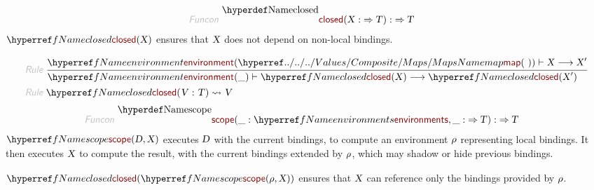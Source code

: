 \begin{align*}
  \KEY{Funcon} ~ 
  & \NAMEDECL{closed}(\VAR{X} :  \TO \VAR{T}) :  \TO \VAR{T}
\end{align*}
$\SHADE{\NAMEREF{closed}
           ( \VAR{X} )}$ ensures that $\SHADE{\VAR{X}}$ does not depend on non-local bindings.

\begin{align*}
  \KEY{Rule} ~ 
    & \RULE{
      \NAMEREF{environment} ( \NAMEHYPER{../../../Values/Composite}{Maps}{map}
                               (  ~  ) ) \vdash \VAR{X} \TRANS 
        \VAR{X}'
      }{
      & \NAMEREF{environment} ( \_ ) \vdash \NAMEREF{closed}
                      ( \VAR{X} ) \TRANS 
          \NAMEREF{closed}
            ( \VAR{X}' )
      }
\\
  \KEY{Rule} ~ 
    & \NAMEREF{closed}
        ( \VAR{V} : \VAR{T} ) \leadsto
        \VAR{V}
\end{align*}
\begin{align*}
  \KEY{Funcon} ~ 
  & \NAMEDECL{scope}(\_ : \NAMEREF{environments}, \_ :  \TO \VAR{T}) :  \TO \VAR{T}
\end{align*}
$\SHADE{\NAMEREF{scope}
           ( \VAR{D},   
             \VAR{X} )}$ executes $\SHADE{\VAR{D}}$ with the current bindings, to compute an environment
  $\SHADE{\VAR{$\rho$}}$ representing local bindings. It then executes $\SHADE{\VAR{X}}$ to compute the result,
  with the current bindings extended by $\SHADE{\VAR{$\rho$}}$, which may shadow or hide previous
  bindings.

$\SHADE{\NAMEREF{closed}
           ( \NAMEREF{scope}
               ( \VAR{$\rho$},    
                 \VAR{X} ) )}$ ensures that $\SHADE{\VAR{X}}$ can reference only the bindings
  provided by $\SHADE{\VAR{$\rho$}}$.

